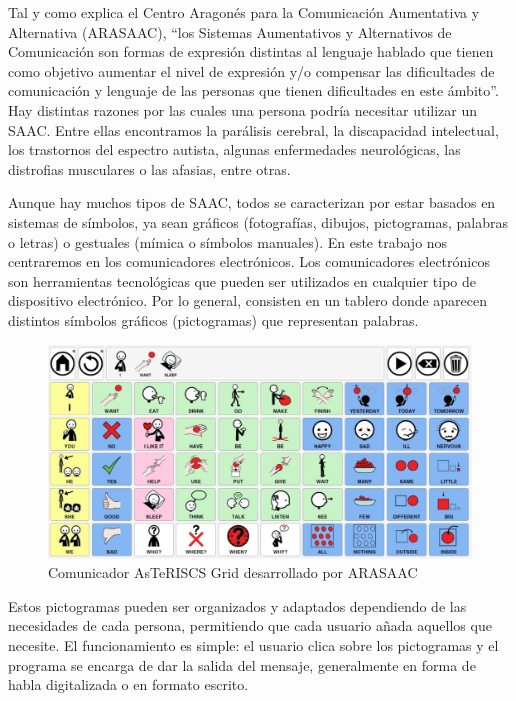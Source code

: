 \documentclass[11pt,spanish,listoffigures,listoftables]{tfgetsinf}
\begin{document}
Tal y como explica el Centro Aragonés para la Comunicación Aumentativa y Alternativa (ARASAAC), “los Sistemas Aumentativos y Alternativos de Comunicación son formas de expresión distintas al lenguaje hablado que tienen como objetivo aumentar el nivel de expresión y/o compensar las dificultades de comunicación y lenguaje de las personas que tienen dificultades en este ámbito”. Hay distintas razones por las cuales una persona podría necesitar utilizar un SAAC. Entre ellas encontramos la parálisis cerebral, la discapacidad intelectual, los trastornos del espectro autista, algunas enfermedades neurológicas, las distrofias musculares o las afasias, entre otras.

Aunque hay muchos tipos de SAAC, todos se caracterizan por estar basados en sistemas de símbolos, ya sean gráficos (fotografías, dibujos, pictogramas, palabras o letras) o gestuales (mímica o símbolos manuales). En este trabajo nos centraremos en los comunicadores electrónicos. Los comunicadores electrónicos son herramientas tecnológicas que pueden ser utilizados en cualquier tipo de dispositivo electrónico. Por lo general, consisten en un tablero donde aparecen distintos símbolos gráficos (pictogramas) que representan palabras.

\begin{figure}[h]
\includegraphics[scale = 0.5]{images/asteriscsGrid.jpg}
\centering
\caption{Comunicador AsTeRISCS Grid desarrollado por ARASAAC}
\end{figure}

Estos pictogramas pueden ser organizados y adaptados dependiendo de las necesidades de cada persona, permitiendo que cada usuario añada aquellos que necesite. El funcionamiento es simple: el usuario clica sobre los pictogramas y el programa se encarga de dar la salida del mensaje, generalmente en forma de habla digitalizada o en formato escrito.
\end{document}

